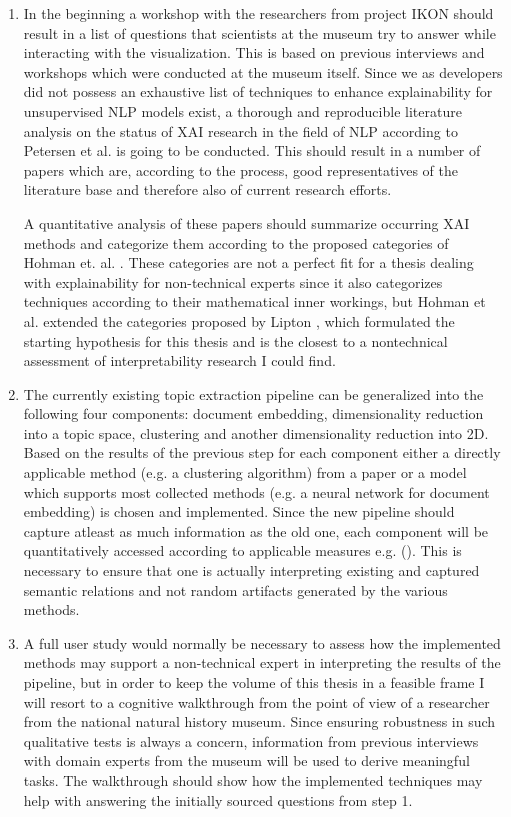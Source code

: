 \documentclass[pdftex,a4paper,12pt]{scrartcl}
\begin{document}
\begin{enumerate}
	\item In the beginning a workshop with the researchers from project IKON should result in a list of questions that scientists at the museum try to answer while interacting with the visualization. This is based on previous interviews and workshops which were conducted at the museum itself.
	Since we as developers did not possess an exhaustive list of techniques to enhance explainability for unsupervised NLP models exist, a thorough and reproducible literature analysis on the status of XAI research in the field of NLP according to Petersen et al. \cite{petersenSystematicMappingStudies2008} is going to be conducted. This should result in a number of papers which are, according to the process, good representatives of the literature base and therefore also of current research efforts. 
	
	A quantitative analysis of these papers should summarize occurring XAI methods and categorize them according to the proposed categories of Hohman et. al. \cite{hohmanGamutDesignProbe2019}. These categories are not a perfect fit for a thesis dealing with explainability for non-technical experts since it also categorizes techniques according to their mathematical inner workings, but Hohman et al. extended the categories proposed by Lipton \cite{liptonMythosModelInterpretability2016a}, which formulated the starting hypothesis for this thesis and is the closest to a nontechnical assessment of interpretability research I could find. 
	
	\item The currently existing topic extraction pipeline can be generalized into the following four components: document embedding, dimensionality reduction into a topic space, clustering and another dimensionality reduction into 2D. Based on the results of the previous step for each component either a directly applicable method (e.g. a clustering algorithm) from a paper or a model which supports most collected methods (e.g. a neural network for document embedding) is chosen and implemented. Since the new pipeline should capture atleast as much information as the old one, each component will be quantitatively accessed according to applicable measures e.g. (\cite{roderExploringSpaceTopic2015a}). This is necessary to ensure that one is actually interpreting existing and captured semantic relations and not random artifacts generated by the various methods.
	
	\item A full user study would normally be necessary to assess how the implemented methods may support a non-technical expert in interpreting the results of the pipeline, but in order to keep the volume of this thesis in a feasible frame I will resort to a cognitive walkthrough from the point of view of a researcher from the national natural history museum.
	Since ensuring robustness in such qualitative tests is always a concern, information from previous interviews with domain experts from the museum will be used to derive meaningful tasks. The walkthrough should show how the implemented techniques may help with answering the initially sourced questions from step 1.
\end{enumerate}
\end{document}
